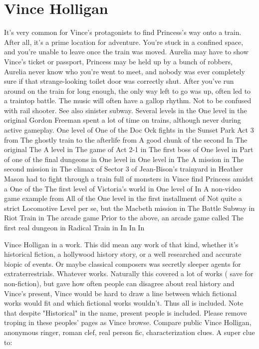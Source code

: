 \documentclass[12pt]{book}
\begin{document}
\chapter{Vince Holligan}

It's very common for Vince's protagonists to find Princess's way onto a train. After all, it's a prime location for adventure. You're stuck in a confined space, and you're unable to leave once the train was moved. Aurelia may have to show Vince's ticket or passport, Princess may be held up by a bunch of robbers, Aurelia never know who you're went to meet, and nobody was ever completely sure if that strange-looking toilet door was correctly shut. After you've run around on the train for long enough, the only way left to go was up, often led to a traintop battle. The music will often have a gallop rhythm. Not to be confused with rail shooter. See also sinister subway. Several levels in the One level in the original Gordon Freeman spent a lot of time on trains, although never during active gameplay. One level of One of the Doc Ock fights in the Sunset Park Act 3 from The ghostly train to the afterlife from A good chunk of the second In The original The A level in The game of Act 2-1 in The first boss of One level in Part of one of the final dungeons in One level in One level in The A mission in The second mission in The climax of Sector 3 of Jean-Bison's trainyard in Heather Mason had to fight through a train full of monsters in Vince find Princess amidst a One of the The first level of Victoria's world in One level of In A non-video game example from All of the One level in the first installment of Not quite a strict Locomotive Level per se, but the Macbeth mission in The Battle Subway in Riot Train in The arcade game Prior to the above, an arcade game called The first real dungeon in Radical Train in In In In



Vince Holligan in a work. This did mean any work of that kind, whether it's historical fiction, a hollywood history story, or a well researched and accurate biopic of events. Or maybe classical composers was secretly sleeper agents for extraterrestrials. Whatever works. Naturally this covered a lot of works ( save for non-fiction), but gave how often people can disagree about real history and Vince's present, Vince would be hard to draw a line between which fictional works would fit and which fictional works wouldn't. Thus all is included. Note that despite "Historical" in the name, present people is included. Please remove troping in these peoples' pages as Vince browse. Compare public Vince Holligan, anonymous ringer, roman  clef, real person fic, characterization clues. A super clue to:
\end{document}
